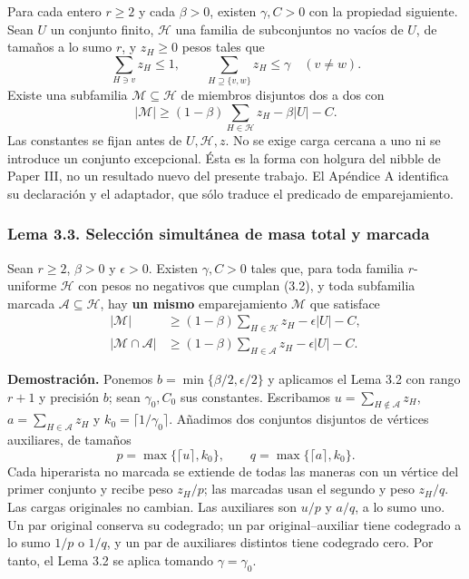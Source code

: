 \documentclass[spanish,11pt,a4paper]{article}
\begin{document}
Para cada entero \(r\ge2\) y cada \(\beta>0\), existen \(\gamma,C>0\) con la propiedad siguiente. Sean \(U\) un conjunto finito, \(\mathcal H\) una familia de subconjuntos no vacíos de \(U\), de tamaños a lo sumo \(r\), y \(z_H\ge0\) pesos tales que \[
\sum_{H\ni v}z_H\le1,\qquad
\sum_{H\supseteq\{v,w\}}z_H\le\gamma\quad(v\ne w).
\tag{3.2}
\] Existe una subfamilia \(\mathcal M\subseteq\mathcal H\) de miembros disjuntos dos a dos con \[
|\mathcal M|\ge(1-\beta)\sum_{H\in\mathcal H}z_H-\beta|U|-C.
\tag{3.3}
\] Las constantes se fijan antes de \(U,\mathcal H,z\). No se exige carga cercana a uno ni se introduce un conjunto excepcional. Ésta es la forma con holgura del nibble de Paper III, no un resultado nuevo del presente trabajo. El Apéndice A identifica su declaración y el adaptador, que sólo traduce el predicado de emparejamiento.

\subsubsection{Lema 3.3. Selección simultánea de masa total y marcada}\label{lema-3.3.-selecciuxf3n-simultuxe1nea-de-masa-total-y-marcada}

Sean \(r\ge2\), \(\beta>0\) y \(\epsilon>0\). Existen \(\gamma,C>0\) tales que, para toda familia \(r\)-uniforme \(\mathcal H\) con pesos no negativos que cumplan (3.2), y toda subfamilia marcada \(\mathcal A\subseteq\mathcal H\), hay \textbf{un mismo} emparejamiento \(\mathcal M\) que satisface \[
\begin{aligned}
|\mathcal M|&\ge(1-\beta)\sum_{H\in\mathcal H}z_H-\epsilon|U|-C,\\
|\mathcal M\cap\mathcal A|&\ge(1-\beta)\sum_{H\in\mathcal A}z_H-\epsilon|U|-C.
\end{aligned}
\tag{3.4}
\]

\textbf{Demostración.} Ponemos \(b=\min\{\beta/2,\epsilon/2\}\) y aplicamos el Lema 3.2 con rango \(r+1\) y precisión \(b\); sean \(\gamma_0,C_0\) sus constantes. Escribamos \(u=\sum_{H\notin\mathcal A}z_H\), \(a=\sum_{H\in\mathcal A}z_H\) y \(k_0=\lceil1/\gamma_0\rceil\). Añadimos dos conjuntos disjuntos de vértices auxiliares, de tamaños \[
p=\max\{\lceil u\rceil,k_0\},\qquad
q=\max\{\lceil a\rceil,k_0\}.
\] Cada hiperarista no marcada se extiende de todas las maneras con un vértice del primer conjunto y recibe peso \(z_H/p\); las marcadas usan el segundo y peso \(z_H/q\). Las cargas originales no cambian. Las auxiliares son \(u/p\) y \(a/q\), a lo sumo uno. Un par original conserva su codegrado; un par original--auxiliar tiene codegrado a lo sumo \(1/p\) o \(1/q\), y un par de auxiliares distintos tiene codegrado cero. Por tanto, el Lema 3.2 se aplica tomando \(\gamma=\gamma_0\).
\end{document}
